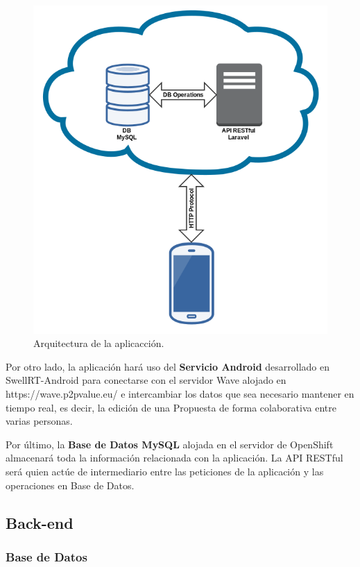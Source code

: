 \begin{figure}[H]
\centering
\includegraphics[keepaspectratio, scale=0.4]{Media/Captures/architecture.png}
\caption{Arquitectura de la aplicacción.}
\label{fig:architecture}
\end{figure}

Por otro lado, la aplicación hará uso del \textbf{Servicio Android} desarrollado en SwellRT-Android \cite{ref:swellRT_android_github} para conectarse con el servidor Wave alojado en https://wave.p2pvalue.eu/ e intercambiar los datos que sea necesario mantener en tiempo real, es decir, la edición de una Propuesta de forma colaborativa entre varias personas.

Por último, la \textbf{Base de Datos MySQL} alojada en el servidor de OpenShift almacenará toda la información relacionada con la aplicación. La API RESTful será quien actúe de intermediario entre las peticiones de la aplicación y las operaciones en Base de Datos.

\subsection{Back-end}

\subsubsection{Base de Datos}\label{sssec:database}

